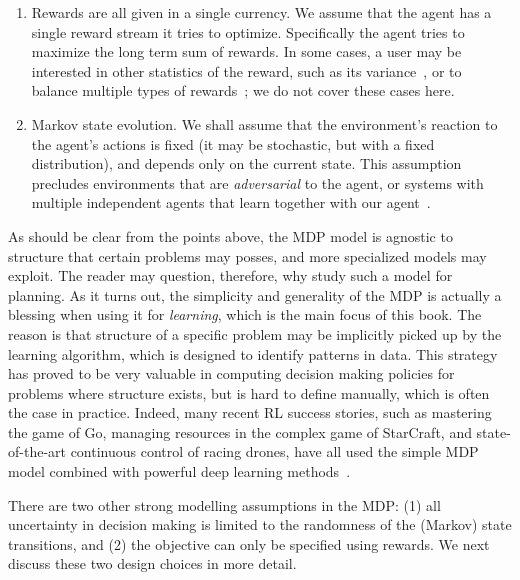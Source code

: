 \begin{enumerate}
    \item Rewards are all given in a single currency. We assume that the agent has a single reward stream it tries to optimize. Specifically the agent tries to maximize the long term sum of rewards. In some cases, a user may be interested in other statistics of the reward, such as its variance~\cite{mannor2013algorithmic}, or to balance multiple types of rewards~\cite{mannor2004geometric}; we do not cover these cases here.
    \item Markov state evolution. We shall assume that the environment's reaction to the agent's actions is fixed (it may be stochastic, but with a fixed distribution), and depends only on the current state. This assumption precludes environments that are \textit{adversarial} to the agent, or systems with multiple independent agents that learn together with our agent~\cite{Cesa-Bianchi-Lugosi-book,Zhang2021}.
\end{enumerate}

As should be clear from the points above, the MDP model is agnostic to structure that certain problems may posses, and more specialized models may exploit. The reader may question, therefore, why study such a model for planning. As it turns out, the simplicity and generality of the MDP is actually a blessing when using it for \textit{learning}, which is the main focus of this book. The reason is that structure of a specific problem may be implicitly picked up by the learning algorithm, which is designed to identify patterns in data. This strategy has proved to be very valuable in computing decision making policies for problems where structure exists, but is hard to define manually, which is often the case in practice. Indeed, many recent RL success stories, such as mastering the game of Go, managing resources in the complex game of StarCraft, and state-of-the-art continuous control of racing drones, have all used the simple MDP model combined with powerful deep learning methods~\cite{silver2016mastering,vinyals2019grandmaster,kaufmann2023champion}.

There are two other strong modelling assumptions in the MDP:  (1) all uncertainty in decision making is limited to the randomness of the (Markov) state transitions, and (2) the objective can only be specified using rewards. We next discuss these two design choices in more detail.

